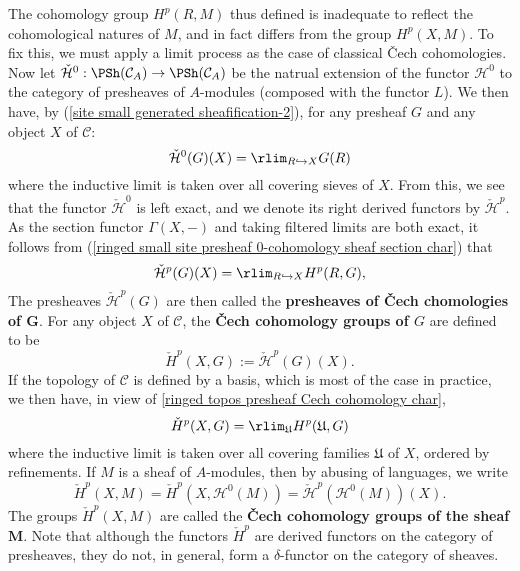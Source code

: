 The cohomology group $H^p(R,M)$ thus defined is inadequate to reflect the cohomological natures of $M$, and in fact differs from the group $H^p(X,M)$. To fix this, we must apply a limit process as the case of classical \v{C}ech cohomologies. Now let $\check{\mathcal{H}}^0:\PSh(\mathcal{C}_A)\to \PSh(\mathcal{C}_A)$ be the natrual extension of the functor $\mathcal{H}^0$ to the category of presheaves of $A$-modules (composed with the functor $L$). We then have, by (\ref{site small generated sheafification-2}), for any presheaf $G$ and any object $X$ of $\mathcal{C}$:
\begin{equation}\label{ringed small site presheaf 0-cohomology sheaf section char}
\check{\mathcal{H}}^0(G)(X)=\rlim_{R\hookrightarrow X}G(R)
\end{equation}
where the inductive limit is taken over all covering sieves of $X$. From this, we see that the functor $\check{\mathcal{H}}^0$ is left exact, and we denote its right derived functors by $\check{\mathcal{H}}^p$. As the section functor $\Gamma(X,-)$ and taking filtered limits are both exact, it follows from (\ref{ringed small site presheaf 0-cohomology sheaf section char}) that
\begin{equation}\label{ringed small site presheaf p-cohomology sheaf section char}
\check{\mathcal{H}}^p(G)(X)=\rlim_{R\hookrightarrow X}H^p(R,G),
\end{equation}
The presheaves $\check{\mathcal{H}}^p(G)$ are then called the \textbf{presheaves of \v{C}ech chomologies of $\bm{G}$}. For any object $X$ of $\mathcal{C}$, the \textbf{\v{C}ech cohomology groups of $G$} are defined to be
\begin{equation}\label{ringed small site presheaf Cech cohomology group def}
\check{H}^p(X,G):=\check{\mathcal{H}}^p(G)(X).
\end{equation}
If the topology of $\mathcal{C}$ is defined by a basis, which is most of the case in practice, we then have, in view of \cref{ringed topos presheaf Cech cohomology char},
\begin{equation}\label{ringed small site presheaf Cech p-cohomology sheaf section char}
\check{H}^p(X,G)=\rlim_\mathfrak{U}H^p(\mathfrak{U},G)
\end{equation}
where the inductive limit is taken over all covering families $\mathfrak{U}$ of $X$, ordered by refinements. If $M$ is a sheaf of $A$-modules, then by abusing of languages, we write
\begin{equation}\label{ringed small site sheaf Cech cohomology group def}
\check{H}^p(X,M)=\check{H}^p(X,\mathcal{H}^0(M))=\check{\mathcal{H}}^p(\mathcal{H}^0(M))(X).
\end{equation}
The groups $\check{H}^p(X,M)$ are called the \textbf{\v{C}ech cohomology groups of the sheaf $\bm{M}$}. Note that although the functors $\check{H}^p$ are derived functors on the category of presheaves, they do not, in general, form a $\delta$-functor on the category of sheaves.
